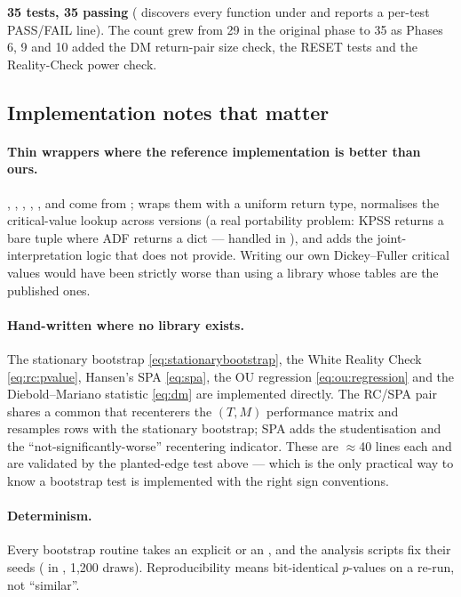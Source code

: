 \textbf{35 tests, 35 passing} ( discovers every
 function under  and reports a per-test
PASS/FAIL line). The count grew from 29 in the original phase to 35 as Phases 6, 9 and 10
added the DM return-pair size check, the RESET tests and the Reality-Check power check.

\subsection{Implementation notes that matter}

\paragraph{Thin wrappers where the reference implementation is better than ours.}
, , , ,
,  and  come from
;  wraps them with a uniform return type, normalises the
critical-value lookup across  versions (a real portability problem:
KPSS returns a bare tuple where ADF returns a dict --- handled in
), and adds the joint-interpretation logic that
 does not provide. Writing our own Dickey--Fuller critical values would
have been strictly worse than using a library whose tables are the published ones.

\paragraph{Hand-written where no library exists.} The stationary bootstrap
\eqref{eq:stationarybootstrap}, the White Reality Check \eqref{eq:rc:pvalue}, Hansen's
SPA \eqref{eq:spa}, the OU regression \eqref{eq:ou:regression} and the Diebold--Mariano
statistic \eqref{eq:dm} are implemented directly. The RC/SPA pair shares a common
 that recenterers the $(T,M)$ performance matrix and
resamples rows with the stationary bootstrap; SPA adds the studentisation and the
``not-significantly-worse'' recentering indicator. These are $\approx$40 lines each and
are validated by the planted-edge test above --- which is the only practical way to know a
bootstrap test is implemented with the right sign conventions.

\paragraph{Determinism.} Every bootstrap routine takes an explicit  or an
, and the analysis scripts fix their seeds ( in
, 1{,}200 draws). Reproducibility means bit-identical
$p$-values on a re-run, not ``similar''.

